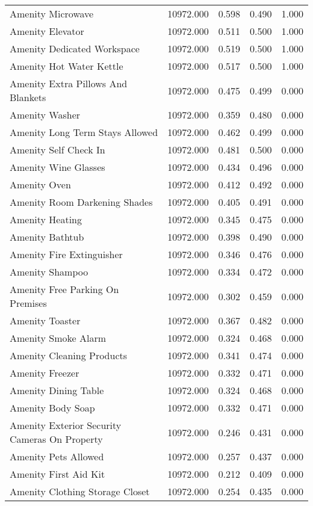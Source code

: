 \begin{tabular}{lllll}
Amenity Microwave & 10972.000 & 0.598 & 0.490 & 1.000 \\
Amenity Elevator & 10972.000 & 0.511 & 0.500 & 1.000 \\
Amenity Dedicated Workspace & 10972.000 & 0.519 & 0.500 & 1.000 \\
Amenity Hot Water Kettle & 10972.000 & 0.517 & 0.500 & 1.000 \\
Amenity Extra Pillows And Blankets & 10972.000 & 0.475 & 0.499 & 0.000 \\
Amenity Washer & 10972.000 & 0.359 & 0.480 & 0.000 \\
Amenity Long Term Stays Allowed & 10972.000 & 0.462 & 0.499 & 0.000 \\
Amenity Self Check In & 10972.000 & 0.481 & 0.500 & 0.000 \\
Amenity Wine Glasses & 10972.000 & 0.434 & 0.496 & 0.000 \\
Amenity Oven & 10972.000 & 0.412 & 0.492 & 0.000 \\
Amenity Room Darkening Shades & 10972.000 & 0.405 & 0.491 & 0.000 \\
Amenity Heating & 10972.000 & 0.345 & 0.475 & 0.000 \\
Amenity Bathtub & 10972.000 & 0.398 & 0.490 & 0.000 \\
Amenity Fire Extinguisher & 10972.000 & 0.346 & 0.476 & 0.000 \\
Amenity Shampoo & 10972.000 & 0.334 & 0.472 & 0.000 \\
Amenity Free Parking On Premises & 10972.000 & 0.302 & 0.459 & 0.000 \\
Amenity Toaster & 10972.000 & 0.367 & 0.482 & 0.000 \\
Amenity Smoke Alarm & 10972.000 & 0.324 & 0.468 & 0.000 \\
Amenity Cleaning Products & 10972.000 & 0.341 & 0.474 & 0.000 \\
Amenity Freezer & 10972.000 & 0.332 & 0.471 & 0.000 \\
Amenity Dining Table & 10972.000 & 0.324 & 0.468 & 0.000 \\
Amenity Body Soap & 10972.000 & 0.332 & 0.471 & 0.000 \\
Amenity Exterior Security Cameras On Property & 10972.000 & 0.246 & 0.431 & 0.000 \\
Amenity Pets Allowed & 10972.000 & 0.257 & 0.437 & 0.000 \\
Amenity First Aid Kit & 10972.000 & 0.212 & 0.409 & 0.000 \\
Amenity Clothing Storage Closet & 10972.000 & 0.254 & 0.435 & 0.000 \\

\end{tabular}
